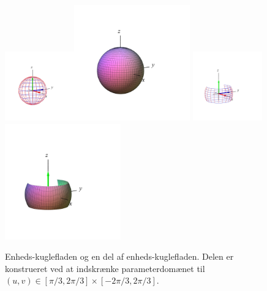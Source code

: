 \begin{figure}[ht]
\centerline{\includegraphics[height=30mm]{FIGS/plotKugWir1}\includegraphics[height=50mm]{FIGS/plotKug1} \qquad \qquad \includegraphics[height=30mm]{FIGS/plotKugWir2} \includegraphics[height=50mm]{FIGS/plotKug2}}
\begin{center}
\caption{\small{Enheds-kuglefladen og en del af enheds-kuglefladen. Delen er konstrueret ved at indskrænke parameterdomænet til $(u,v) \in [\pi/3, 2\pi/3] \times [-2\pi/3, 2\pi/3]$. }} \label{figKugleflade}
\end{center}
\end{figure}

